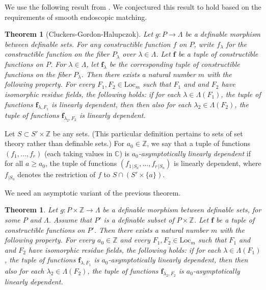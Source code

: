 \documentclass[12pt]{amsart}
\newcommand{\ring}[1]{{\mathbb #1}}
\def\bf{\mathbf f}
\newcommand{\Loc}{\mathrm{Loc}}
\theoremstyle{plain}
\newtheorem{theorem}[thm]{Theorem}
\theoremstyle{definition}
\begin{document}
We use the following result from \cite{CGH2}.  We conjectured
this result to hold based on the 
requirements of smooth endoscopic matching.

\begin{theorem}[Cluckers-Gordon-Halupczok]\label{thm:cgh}
Let $g:P\to \Lambda$ be a definable morphism between
  definable sets.  For  any constructible function $f$ on $P$, write
  $f_{\lambda}$ for the constructible function  on the fiber $P_\lambda$ over $\lambda\in
  \Lambda$.  Let $\bf$ be a tuple of constructible
  functions on $P$. For $\lambda\in \Lambda$, let $\bf_\lambda$ be the corresponding tuple
  of constructible functions on the fiber $P_\lambda$.  Then there exists a
  natural number $m$ with the following property.  For every $F_1,F_2 \in
  \Loc_{m}$ such that $F_1$ and and $F_2$ have isomorphic residue
  fields, the following holds: if for each $\lambda\in \Lambda({F_1})$, the tuple of
  functions $\bf_{\lambda,F_1}$ is linearly dependent, then then also for each
  $\lambda_2\in \Lambda({F_2})$, the tuple of functions $\bf_{\lambda_2,F_2}$ is linearly
  dependent.
\end{theorem}

Let $S \subset S'\times\ring{Z}$ be any sets.  (This particular
definition pertains to sets of set theory rather than definable sets.)
For $a_0\in\ring{Z}$, we say that a tuple of functions
$(f_1,\ldots,f_r)$ (each taking values in $\ring{C}$) is {\it
  $a_0$-asymptotically linearly dependent} if for all $a\ge a_0$, the
tuple of functions $(f_{1\,|S_a},\ldots,f_{r\,|S_a})$ is linearly
dependent, where $f_{|S_a}$ denotes the restriction of $f$ to $S\cap
(S'\times\{a\})$.

We need an asymptotic variant of the previous theorem.


\begin{theorem}\label{thm:cgh-asymp}
  Let $g:P\times\ring{Z}\to \Lambda$ be a definable morphism between
  definable sets, for some $P$ and $\Lambda$.  Assume that $P'$ is a
  definable subset of $P\times\ring{Z}$.  Let $\bf$ be a tuple of
  constructible functions on $P'$.  Then there exists a natural number
  $m$ with the following property.  For every $a_0\in\ring{Z}$ and
  every $F_1,F_2 \in \Loc_{m}$ such that $F_1$ and and $F_2$ have
  isomorphic residue fields, the following holds: if for each
  $\lambda\in \Lambda({F_1})$, the tuple of functions
  $\bf_{\lambda,F_1}$ is $a_0$-asymptotically linearly dependent, then
  then also for each $\lambda_2\in \Lambda({F_2})$, the tuple of
  functions $\bf_{\lambda_2,F_2}$ is $a_0$-asymptotically linearly
  dependent.
\end{theorem}
\end{document}
